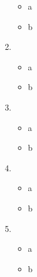 \documentclass{article}
\begin{document}
\begin{enumerate}
\begin{itemize}
\item{a}
\item{b}
\end{itemize}
\item
\begin{itemize}
\item{a}
\item{b}
\end{itemize}
\item
\begin{itemize}
\item{a}
\item{b}
\end{itemize}
\item
\begin{itemize}
\item{a}
\item{b}
\end{itemize}
\item
\begin{itemize}
\item{a}
\item{b}
\end{itemize}
\end{enumerate}
\end{document}
